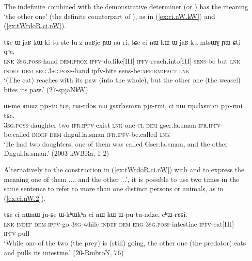 The indefinite  combined with the demonstrative determiner  (or ) has the meaning `the other one' (the definite counterpart of ), as in (\ref{ex:ci.nW.kW}) and (\ref{ex:tWrdoR.ci.nW}).

\begin{exe}
\ex \label{ex:ci.nW.kW}
 \gll tɕe ɯ-jaʁ kɯ ki tu-ste lu-z-naʁje ɲɯ-ŋu ri, tɕe ci nɯ kɯ ɯ-jaʁ ku-mtsɯɣ ɲɯ-ɕti qʰe, \\
 \textsc{lnk} \textsc{3sg.poss}-hand \textsc{dem:prox} \textsc{ipfv}-do.like[III]  \textsc{ipfv}-reach.into[III] \textsc{sens}-be but \textsc{lnk} \textsc{indef} \textsc{dem} \textsc{erg} \textsc{3sg.poss}-hand  ipfv-bite sens-be:\textsc{affirm:fact} \textsc{lnk} \\
\glt `(The cat) reaches with its paw (into the whole), but the other one (the weasel) bites its paw.' (27-spjaNkW)
\end{exe}

\begin{exe}
\ex \label{ex:tWrdoR.ci.nW}
 \gll 
ɯ-me ʁnɯz pjɤ-tu tɕe, tɯ-rdoʁ nɯ χsɤrlɤsmɤn pjɤ-rmi, ci nɯ rŋɯlɤsmɤn pjɤ-rmi tɕe, \\
\textsc{3sg.poss}-daughter two \textsc{ifr.ipfv}-exist \textsc{lnk} one-\textsc{cl} \textsc{dem} gser.la.sman \textsc{ifr.ipfv}-be.called \textsc{indef} \textsc{dem} dngul.la.sman \textsc{ifr.ipfv}-be.called \textsc{lnk} \\
\glt `He had two daughters, one of them was called Gser.la.sman, and the other Dngul.la.sman.' (2003-kWBRa, 1-2)
\end{exe}

Alternatively to the construction in (\ref{ex:tWrdoR.ci.nW}) with  and  to express the meaning one of them .... and the other ...', it is possible to use  two times in the same sentence to refer to more than one distinct persons or animals, as in (\ref{ex:ci.nW.2}).

\begin{exe}
\ex \label{ex:ci.nW.2}
 \gll tɕe ci nɯnɯ ju-ɕe ɯ-kʰɯkʰa ci nɯ kɯ ɯ-pu tu-ndze, cʰɯ-rɤɕi. \\
\textsc{lnk} \textsc{indef} \textsc{dem} \textsc{ipfv}-go \textsc{3sg}-while \textsc{indef} \textsc{dem} \textsc{erg} \textsc{3sg.poss}-intestine \textsc{ipfv}-eat[III] \textsc{ipfv}-pull \\
\glt `While one of the two (the prey) is (still) going, the other one (the predator) eats and pulls its intestine.'  (20-RmbroN, 76)
\end{exe}

